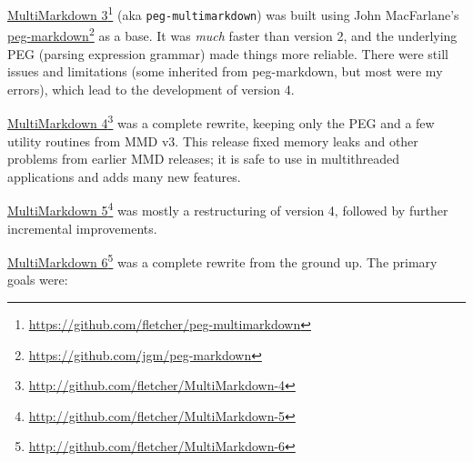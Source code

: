 \href{https://github.com/fletcher/peg-multimarkdown}{MultiMarkdown 3}\footnote{\href{https://github.com/fletcher/peg-multimarkdown}{https:\slash \slash github.com\slash fletcher\slash peg-multimarkdown}} (aka \texttt{peg-multimarkdown}) was built using John MacFarlane's \href{https://github.com/jgm/peg-markdown}{peg-markdown}\footnote{\href{https://github.com/jgm/peg-markdown}{https:\slash \slash github.com\slash jgm\slash peg-markdown}} as a base. It was \emph{much} faster than version 2, and the underlying PEG (parsing expression grammar) made things more reliable. There were still issues and limitations (some inherited from peg-markdown, but most were my errors), which lead to the development of version 4.

\href{http://github.com/fletcher/MultiMarkdown-4}{MultiMarkdown 4}\footnote{\href{http://github.com/fletcher/MultiMarkdown-4}{http:\slash \slash github.com\slash fletcher\slash MultiMarkdown-4}} was a complete rewrite, keeping only the PEG and a few utility routines from \gls{MMD} v3. This release fixed memory leaks and other problems from earlier \gls{MMD} releases; it is safe to use in multithreaded applications and adds many new features.

\href{http://github.com/fletcher/MultiMarkdown-5}{MultiMarkdown 5}\footnote{\href{http://github.com/fletcher/MultiMarkdown-5}{http:\slash \slash github.com\slash fletcher\slash MultiMarkdown-5}} was mostly a restructuring of version 4, followed by further incremental improvements.

\href{http://github.com/fletcher/MultiMarkdown-6}{MultiMarkdown 6}\footnote{\href{http://github.com/fletcher/MultiMarkdown-6}{http:\slash \slash github.com\slash fletcher\slash MultiMarkdown-6}} was a complete rewrite from the ground up. The primary goals were:

